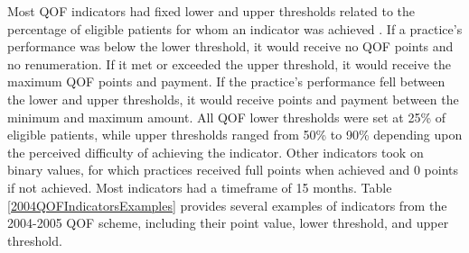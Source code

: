 \documentclass[12pt]{article}
\begin{document}
Most QOF indicators had fixed lower and upper thresholds related to the percentage of eligible patients for whom an indicator was achieved \citep{doranSettingPerformanceTargets2014}. If a practice's performance was below the lower threshold, it would receive no QOF points and no renumeration. If it met or exceeded the upper threshold, it would receive the maximum QOF points and payment. If the practice's performance fell between the lower and upper thresholds, it would receive points and payment between the minimum and maximum amount. All QOF lower thresholds were set at 25\% of eligible patients, while upper thresholds ranged from 50\% to 90\% depending upon the perceived difficulty of achieving the indicator. Other indicators took on binary values, for which practices received full points when achieved and 0 points if not achieved. Most indicators had a timeframe of 15 months. Table \ref{2004QOFIndicatorsExamples} provides several examples of indicators from the 2004-2005 QOF scheme, including their point value, lower threshold, and upper threshold.
\end{document}
